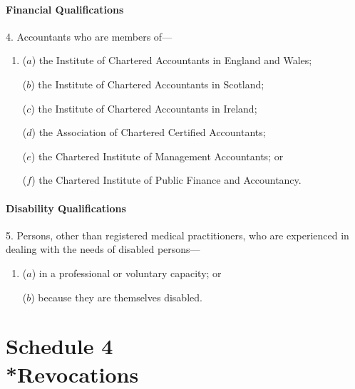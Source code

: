 \documentclass[12pt,a4paper]{article}
\begin{document}
\subsection*{Financial Qualifications}

4.  Accountants who are members of—
\begin{enumerate}\item[]
($a$) the Institute of Chartered Accountants in England and Wales;

($b$) the Institute of Chartered Accountants in Scotland;

($c$) the Institute of Chartered Accountants in Ireland;

($d$) the Association of Chartered Certified Accountants;

($e$) the Chartered Institute of Management Accountants; or

($f$) the Chartered Institute of Public Finance and Accountancy.
\end{enumerate}

\subsection*{Disability Qualifications}

5.  Persons, other than registered medical practitioners, who are experienced in dealing with the needs of disabled persons—
\begin{enumerate}\item[]
($a$) in a professional or voluntary capacity; or

($b$) because they are themselves disabled.
\end{enumerate}

\part[Schedule 4 --- Revocations]{Schedule 4\\*Revocations}

\renewcommand\parthead{--- Schedule 4}
\end{document}
